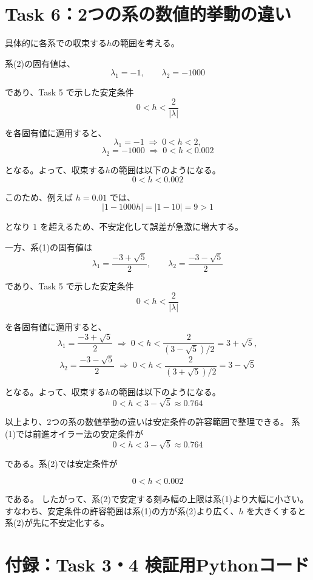 \documentclass[11pt,a4paper]{jlreq}
\begin{document}
\section*{Task 6：2つの系の数値的挙動の違い}

具体的に各系での収束する$h$の範囲を考える。

系(2)の固有値は、
\[
\lambda_1=-1,\qquad \lambda_2=-1000
\]

であり、Task 5 で示した安定条件
\[
0<h<\frac{2}{|\lambda|}
\]

を各固有値に適用すると、
\[
\lambda_1=-1\;\Rightarrow\; 0<h<2,
\]
\[
\lambda_2=-1000\;\Rightarrow\; 0<h<0.002
\]

となる。よって、収束する$h$の範囲は以下のようになる。
\[
0<h<0.002
\]

このため、例えば $h=0.01$ では、
\[
|1-1000h|=|1-10|=9>1
\]

となり $1$ を超えるため、不安定化して誤差が急激に増大する。

一方、系(1)の固有値は
\[
\lambda_1=\frac{-3+\sqrt{5}}{2},\qquad \lambda_2=\frac{-3-\sqrt{5}}{2}
\]

であり、Task 5 で示した安定条件
\[
0<h<\frac{2}{|\lambda|}
\]

を各固有値に適用すると、
\[
\lambda_1=\frac{-3+\sqrt{5}}{2}\;\Rightarrow\; 0<h<\frac{2}{(3-\sqrt{5})/2}=3+\sqrt{5},
\]
\[
\lambda_2=\frac{-3-\sqrt{5}}{2}\;\Rightarrow\; 0<h<\frac{2}{(3+\sqrt{5})/2}=3-\sqrt{5}
\]

となる。よって、収束する$h$の範囲は以下のようになる。
\[
0<h<3-\sqrt{5}\approx 0.764
\]

以上より、2つの系の数値挙動の違いは安定条件の許容範囲で整理できる。  
系(1)では前進オイラー法の安定条件が
\[
0<h<3-\sqrt{5}\approx0.764
\]

である。系(2)では安定条件が

\[
0<h<0.002
\]

である。  
したがって、系(2)で安定する刻み幅の上限は系(1)より大幅に小さい。
すなわち、安定条件の許容範囲は系(1)の方が系(2)より広く、$h$ を大きくすると系(2)が先に不安定化する。

\clearpage
\section*{付録：Task 3・4 検証用Pythonコード}
\lstset{basicstyle=\ttfamily\small,breaklines=true,frame=single}

\end{document}
